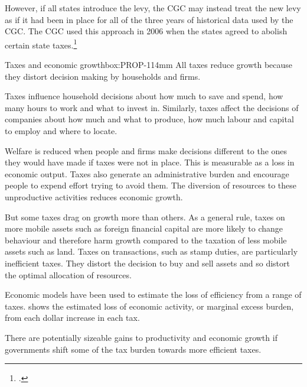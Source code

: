 However, if all states introduce the levy, the CGC may instead treat the new levy as if it had been in place for all of the three years of historical data used by the CGC\@. The CGC used this approach in 2006 when the states agreed to abolish certain state taxes.\footcite[][23]{CGC2015-Volume2}  

\FloatBarrier

\cleardoubleevenstandardpage\thispagestyle{empty}
\begin{bigboxCsep*}{Taxes and economic growth}{box:PROP-1}{14mm}
All taxes reduce growth because they distort decision making by households and firms.

Taxes influence household decisions about how much to save and spend, how many hours to work and what to invest in. Similarly, taxes affect the decisions of companies about how much and what to produce, how much labour and capital to employ and where to locate.

Welfare is reduced when people and firms make decisions different to the ones they would have made if taxes were not in place. This is measurable as a loss in economic output.  Taxes also generate an administrative burden and encourage people to expend effort trying to avoid them. The diversion of resources to these unproductive activities reduces economic growth. 

But some taxes drag on growth more than others. As a general rule, taxes on more mobile assets such as foreign financial capital are more likely to change behaviour and therefore harm growth compared to the taxation of less mobile assets such as land. Taxes on transactions, such as stamp duties, are particularly inefficient taxes. They distort the decision to buy and sell assets and so distort the optimal allocation of resources. 

Economic models have been used to estimate the loss of efficiency from a range of taxes.  shows the estimated loss of economic activity, or marginal excess burden, from each dollar increase in each tax.

\eject

There are potentially sizeable gains to productivity and economic growth if governments shift some of the tax burden towards more efficient taxes.


\end{bigboxCsep*}
